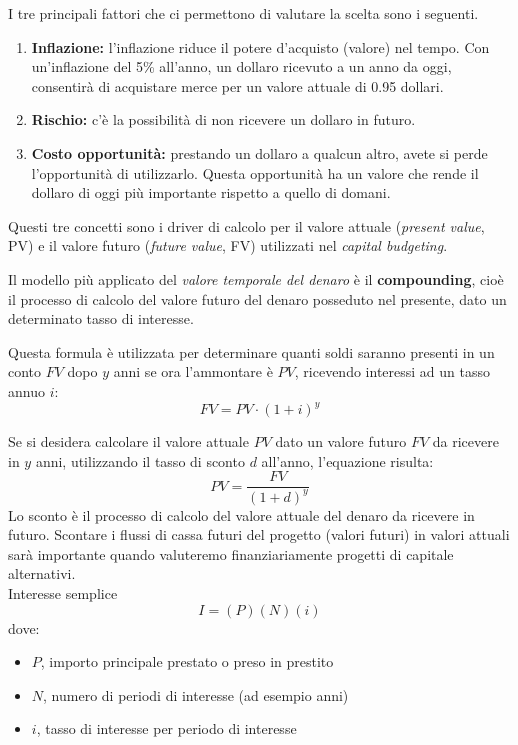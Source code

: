 \documentclass[a4paper,portrait,12pt]{article}
\theoremstyle{definition}
\begin{document}
I tre principali fattori che ci permettono di valutare la scelta sono i seguenti.
\begin{enumerate}
\item \textbf{Inflazione:} l'inflazione riduce il potere d'acquisto (valore) nel tempo.
Con un'inflazione del 5\% all'anno, un dollaro ricevuto a un anno da oggi,
consentirà di acquistare merce per un valore attuale di 0.95 dollari.
\item \textbf{Rischio:} c'è la possibilità  di non ricevere un dollaro in futuro.
\item \textbf{Costo opportunità:} prestando un dollaro a qualcun altro, avete si perde l'opportunità di utilizzarlo.
Questa opportunità ha un valore che rende il dollaro di oggi più importante rispetto a quello di domani.
\end{enumerate}

Questi tre concetti sono i driver di calcolo per il valore attuale (\emph{present value}, PV) e il valore futuro (\emph{future value}, FV) utilizzati nel \emph{capital budgeting}.


Il modello più applicato del \emph{valore temporale del denaro} è il \textbf{compounding}, cioè il processo di calcolo del valore futuro del denaro posseduto nel presente, dato un determinato tasso di interesse.

Questa formula è utilizzata per determinare quanti soldi saranno presenti in un conto $FV$ dopo $y$ anni se ora l'ammontare è $PV$, ricevendo interessi ad un tasso annuo $i$:
$$
FV = PV \cdot (1 + i)^y
$$

Se si desidera calcolare il valore attuale $PV$ dato un valore futuro $FV$ da ricevere in $y$ anni, utilizzando il tasso di sconto $d$ all'anno, l'equazione risulta:
$$
PV = \frac{FV}{(1+d)^y}
$$
Lo sconto è il processo di calcolo del valore attuale del denaro da ricevere in futuro.
Scontare i flussi di cassa futuri del progetto (valori futuri) in valori attuali sarà importante quando valuteremo finanziariamente progetti di capitale alternativi.\\

Interesse semplice
$$
I = (P) (N) (i)
$$
dove:
\begin{itemize}
\item $P$, importo principale prestato o preso in prestito
\item $N$, numero di periodi di interesse (ad esempio anni)
\item $i$, tasso di interesse per periodo di interesse
\end{itemize}
\end{document}
